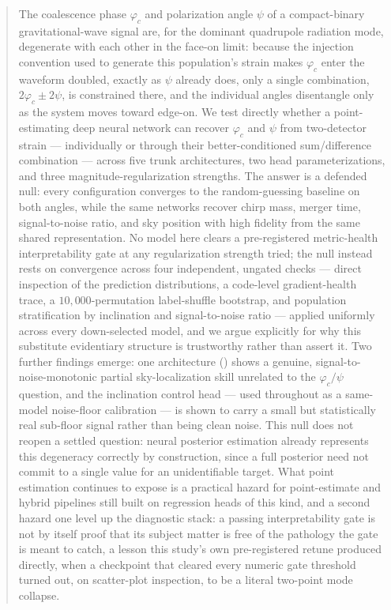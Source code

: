 \begin{abstract}
    The coalescence phase $\varphi_c$ and polarization angle $\psi$ of a compact-binary gravitational-wave signal are, for the dominant quadrupole radiation mode, degenerate with each other in the face-on limit: because the injection convention used to generate this population's strain makes $\varphi_c$ enter the waveform doubled, exactly as $\psi$ already does, only a single combination, $2\varphi_c \pm 2\psi$, is constrained there, and the individual angles disentangle only as the system moves toward edge-on.
    We test directly whether a point-estimating deep neural network can recover $\varphi_c$ and $\psi$ from two-detector strain --- individually or through their better-conditioned sum/difference combination --- across five trunk architectures, two head parameterizations, and three magnitude-regularization strengths.
    The answer is a defended null: every configuration converges to the random-guessing baseline on both angles, while the same networks recover chirp mass, merger time, signal-to-noise ratio, and sky position with high fidelity from the same shared representation.
    No model here clears a pre-registered metric-health interpretability gate at any regularization strength tried; the null instead rests on convergence across four independent, ungated checks --- direct inspection of the prediction distributions, a code-level gradient-health trace, a $10{,}000$-permutation label-shuffle bootstrap, and population stratification by inclination and signal-to-noise ratio --- applied uniformly across every down-selected model, and we argue explicitly for why this substitute evidentiary structure is trustworthy rather than assert it.
    Two further findings emerge: one architecture (\cnnAttn) shows a genuine, signal-to-noise-monotonic partial sky-localization skill unrelated to the $\varphi_c/\psi$ question, and the inclination control head --- used throughout as a same-model noise-floor calibration --- is shown to carry a small but statistically real sub-floor signal rather than being clean noise.
    This null does not reopen a settled question: neural posterior estimation already represents this degeneracy correctly by construction, since a full posterior need not commit to a single value for an unidentifiable target.
    What point estimation continues to expose is a practical hazard for point-estimate and hybrid pipelines still built on regression heads of this kind, and a second hazard one level up the diagnostic stack: a passing interpretability gate is not by itself proof that its subject matter is free of the pathology the gate is meant to catch, a lesson this study's own pre-registered retune produced directly, when a checkpoint that cleared every numeric gate threshold turned out, on scatter-plot inspection, to be a literal two-point mode collapse.
\end{abstract}
